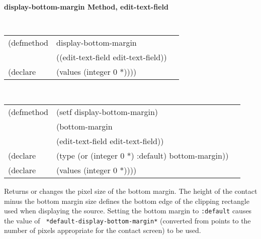 {\samepage  
{\large {\bf display-bottom-margin \hfill Method, edit-text-field}}
\begin{flushright} \parbox[t]{6.125in}{
\tt
\begin{tabular}{lll}
\raggedright
(defmethod & display-bottom-margin & \\
& ((edit-text-field  edit-text-field)) \\
(declare & (values (integer 0 *))))
\end{tabular}
\rm

}\end{flushright}}

\begin{flushright} \parbox[t]{6.125in}{
\tt
\begin{tabular}{lll}
\raggedright
(defmethod & (setf display-bottom-margin) & \\
         & (bottom-margin \\
         & (edit-text-field  edit-text-field)) \\
(declare &(type (or (integer 0 *) :default)  bottom-margin))\\
(declare & (values (integer 0 *))))
\end{tabular}
\rm}
\end{flushright}

\begin{flushright} \parbox[t]{6.125in}{
Returns or changes the pixel size of the
bottom margin.  The height of the contact minus the bottom margin size defines
the bottom edge of the clipping rectangle used when displaying the source.
Setting the bottom margin to {\tt :default} causes the value of {\tt
*default-display-bottom-margin*} (converted from points to the number of pixels
appropriate for the contact screen) to be used.
}
\end{flushright}




